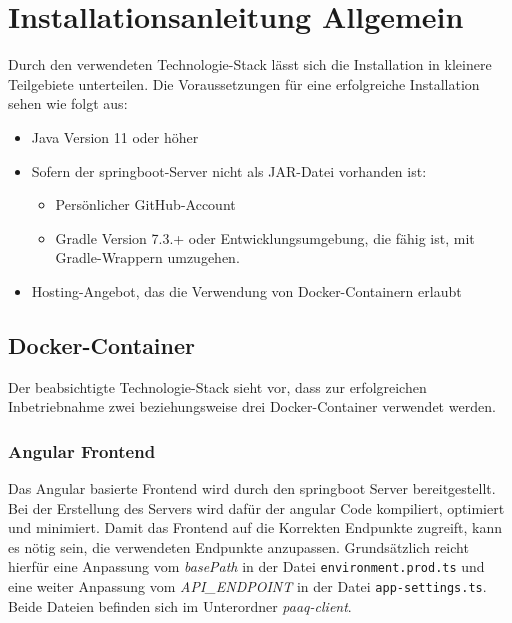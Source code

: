 \documentclass[../main.tex]{subfiles}
\begin{document}
	\section{Installationsanleitung Allgemein}
	Durch den verwendeten Technologie-Stack lässt sich die Installation in kleinere Teilgebiete unterteilen. Die Voraussetzungen für eine erfolgreiche Installation sehen wie folgt aus:
	\begin{itemize}
		\item Java Version 11 oder höher
		\item Sofern der \gls{springboot}-Server nicht als JAR-Datei vorhanden ist:
		\begin{itemize}
			\item Persönlicher GitHub-Account
			\item Gradle Version 7.3.+ oder Entwicklungsumgebung, die fähig ist, mit Gradle-Wrappern umzugehen.
		\end{itemize}
		\item Hosting-Angebot, das die Verwendung von Docker-Containern erlaubt
	\end{itemize}
	
	\subsection{Docker-Container}
	Der beabsichtigte Technologie-Stack sieht vor, dass zur erfolgreichen Inbetriebnahme zwei beziehungsweise drei Docker-Container verwendet werden.
	
	\subsubsection{Angular Frontend}
	\par Das Angular basierte Frontend wird durch den \gls{springboot} Server bereitgestellt. Bei der Erstellung des Servers wird dafür der \gls{angular} Code kompiliert, optimiert und minimiert. Damit das Frontend auf die Korrekten Endpunkte zugreift, kann es nötig sein, die verwendeten Endpunkte anzupassen. Grundsätzlich reicht hierfür eine Anpassung vom \textit{basePath} in der Datei \texttt{environment.prod.ts} und eine weiter Anpassung vom \textit{API\_ENDPOINT} in der Datei \texttt{app-settings.ts}. Beide Dateien befinden sich im Unterordner \textit{paaq-client}.
	
\end{document}
